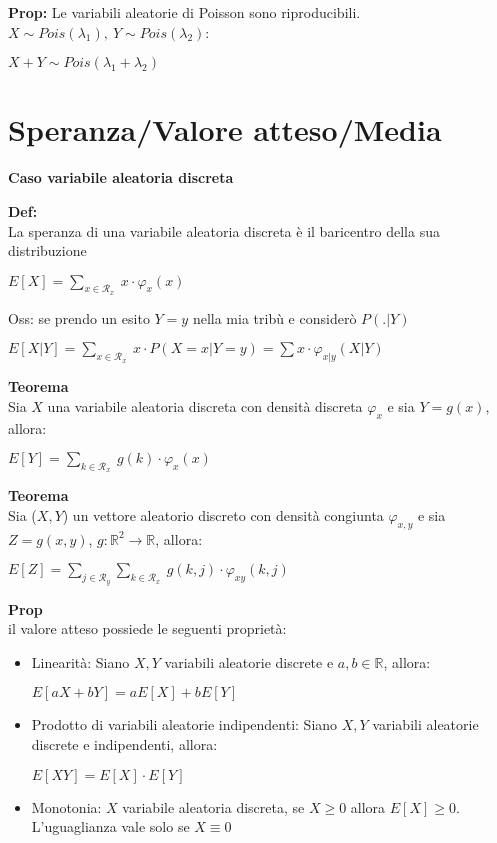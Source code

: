 \documentclass[11pt, letterpaper]{article}
\begin{document}
\newpage
\textbf{Prop:} Le variabili aleatorie di Poisson sono riproducibili. 
$X\sim Pois(\lambda_{1}),\ Y\sim Pois(\lambda_{2})$:
\begin{center}
    $X+Y\sim Pois(\lambda_{1}+\lambda_{2})$
\end{center}

\section{Speranza/Valore atteso/Media}
\begin{center}
    \textbf{Caso variabile aleatoria discreta}
\end{center}

\textbf{Def:}\\La speranza di una variabile aleatoria discreta è il baricentro della sua distribuzione
\begin{center}
    $E[X]=\sum_{x\in\mathcal{R}_{x}}\ x\cdot\varphi_{x}(x)$
\end{center}

Oss: se prendo un esito $Y=y$ nella mia tribù e considerò $P(.|Y)$
\begin{center}
    $E[X|Y]=\sum_{x\in\mathcal{R}_{x}}\ x\cdot P(X=x|Y=y)=\sum x\cdot\varphi_{x|y}(X|Y)$
\end{center}

\textbf{Teorema}\\Sia $X$ una variabile aleatoria discreta con densità discreta $\varphi_{x}$ e sia $Y=g(x)$, allora:
\begin{center}
    $E[Y]=\sum_{k\in\mathcal{R}_{x}}\ g(k)\cdot\varphi_{x}(x)$
\end{center}

\textbf{Teorema}\\Sia ($X,Y$) un vettore aleatorio discreto con densità congiunta $\varphi_{x,y}$ e sia $Z=g(x,y)$,
$g:\mathbb{R}^{2}\rightarrow\mathbb{R}$, allora:
\begin{center}
    $E[Z]=\sum_{j\in\mathcal{R}_{y}}\sum_{k\in\mathcal{R}_{x}}\ g(k,j)\cdot\varphi_{xy}(k,j)$
\end{center}

\newpage
\textbf{Prop}\\il valore atteso possiede le seguenti proprietà:
\begin{itemize}
    \item Linearità: Siano $X,Y$ variabili aleatorie discrete e $a,b\in\mathbb{R}$, allora:
    \begin{center}
        $E[aX+bY]=aE[X]+bE[Y]$
    \end{center}
    \item Prodotto di variabili aleatorie indipendenti: Siano $X,Y$ variabili aleatorie discrete e indipendenti, allora:
    \begin{center}
        $E[XY]=E[X]\cdot E[Y]$
    \end{center}
    \item Monotonia: $X$ variabile aleatoria discreta, se $X\geq 0$ allora $E[X]\geq 0$. L'uguaglianza vale solo se $X\equiv 0$
\end{itemize}
\end{document}
